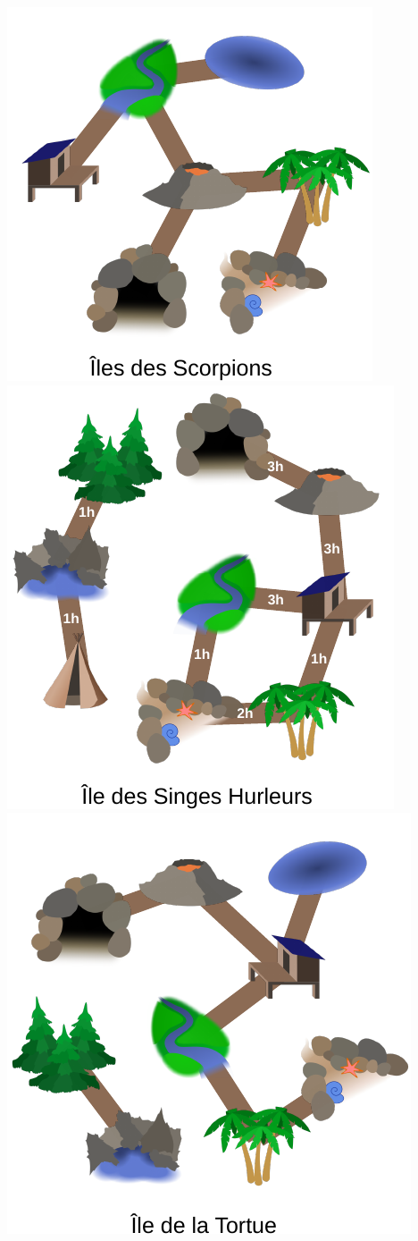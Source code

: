 \documentclass[french, landscape]{article}
\begin{document}
\newpage\includegraphics[height=\textheight]{iles/svgs/modelisation/scorpions.pdf}
\newpage\includegraphics[height=\textheight]{iles/svgs/modelisation/singes-hurleurs.pdf}
\newpage\includegraphics[height=\textheight]{iles/svgs/modelisation/ile_tortue.pdf}
\end{document}
